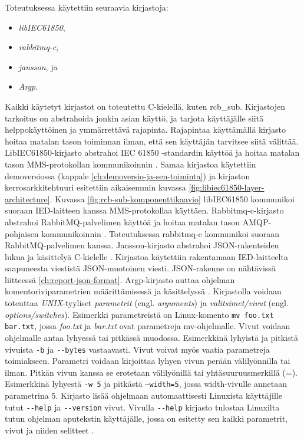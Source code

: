 Toteutuksessa käytettiin seuraavia kirjastoja:
\begin{itemize}
	\item \emph{libIEC61850},
	\item \emph{rabbitmq-c},
	\item \emph{jansson}, ja
	\item \emph{Argp}.
\end{itemize}
Kaikki käytetyt kirjastot on toteutettu C-kielellä, kuten rcb\_sub. Kirjastojen tarkoitus on abstrahoida jonkin asian käyttö, ja tarjota käyttäjälle siitä helppokäyttöinen ja ymmärrettävä rajapinta. Rajapintaa käyttämällä kirjasto hoitaa matalan tason toiminnan ilman, että sen käyttäjän tarvitsee siitä välittää. LibIEC61850-kirjasto abstrahoi IEC 61850 -standardin käyttöä ja hoitaa matalan tason MMS-protokollan kommunikoinnin \mbox{\cite{libIEC61850-repo}}. Samaa kirjastoa käytettiin demoversiossa (kappale \ref{ch:demoversio-ja-sen-toiminta}) ja kirjaston kerrosarkkitehtuuri esitettiin aikaisemmin kuvassa \ref{fig:libiec61850-layer-architecture}. Kuvassa \ref{fig:rcb-sub-komponenttikaavio} libIEC61850 kommunikoi suoraan IED\--\-lait\-teen kanssa MMS-protokollaa käyttäen. Rabbitmq-c-kirjasto abstrahoi RabbitMQ-palvelimen käyttöä ja hoitaa matalan tason AMQP-pohjaisen kommunikoinnin \mbox{\cite{rabbitmq-c-repo}}. Toteutuksessa rabbitmq-c kommunikoi suoraan RabbitMQ-palvelimen kanssa. Jansson-kirjasto abstrahoi JSON-rakenteiden lukua ja käsittelyä C-kielelle \mbox{\cite{jansson-repo}}. Kirjastoa käytettiin rakentamaan IED-\-lait\-teel\-ta saapuneesta viestistä JSON-muotoinen viesti. JSON-rakenne on nähtävissä liitteessä \ref{ch:report-json-format}. Argp-kirjasto auttaa ohjelman komentoriviparametrien määrittämisessä ja käsittelyssä \mbox{\cite{argp-glibc-guide}}. Kirjastolla voidaan toteuttaa \emph{UNIX}-tyyliset \emph{parametrit} (engl. \emph{arguments}) ja \emph{valitsimet/vivut} (engl. \emph{options/switches}). Esimerkki parametreistä on Linux-komento \texttt{mv foo.txt bar.txt}, jossa \emph{foo.txt} ja \emph{bar.txt} ovat parametreja mv-ohjelmalle. Vivut voidaan ohjelmalle antaa lyhyessä tai pitkässä muodossa. Esimerkkinä lyhyistä ja pitkistä vivuista \texttt{-b} ja \texttt{-{}-bytes} vastaavasti. Vivut voivat myös vaatia parametreja toimiakseen. Parametri voidaan kirjoittaa lyhyen vivun perään välilyönnilla tai ilman. Pitkän vivun kanssa se erotetaan välilyönillä tai yhtäsuuruusmerkillä (=). Esimerkkinä lyhyestä \texttt{-w 5} ja pitkästä \texttt{--width=5}, jossa width-vivulle annetaan parametrina 5. Kirjasto lisää ohjelmaan automaattisesti Linuxista käyttäjille tutut \texttt{-{}-help} ja \texttt{-{}-version} vivut. Vivulla \texttt{-{}-help} kirjasto tulostaa Linuxilta tutun ohjelman aputekstin käyttäjälle, jossa on esitetty sen kaikki parametrit, vivut ja niiden selitteet \mbox{\cite{step-by-step-into-argp}}.

